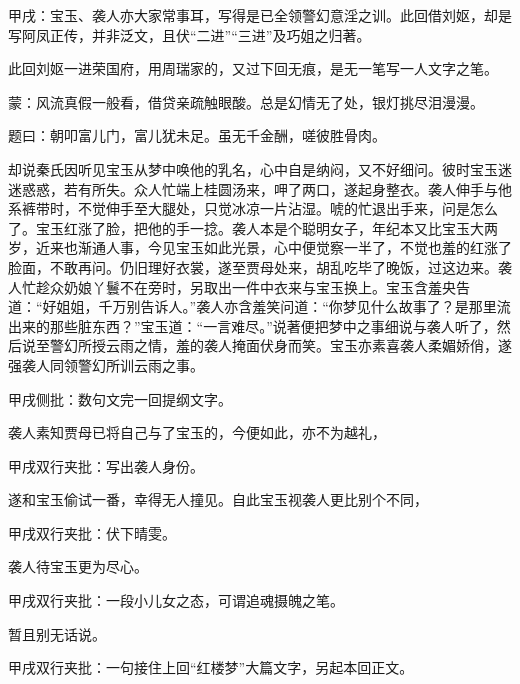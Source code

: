 \begin{parag}

    \begin{note}甲戌：宝玉、袭人亦大家常事耳，写得是已全领警幻意淫之训。此回借刘妪，却是写阿凤正传，并非泛文，且伏“二进”“三进”及巧姐之归著。\end{note}
\end{parag}


\begin{parag}


    \begin{note}此回刘妪一进荣国府，用周瑞家的，又过下回无痕，是无一笔写一人文字之笔。\end{note}
\end{parag}


\begin{parag}


    \begin{note}蒙：风流真假一般看，借贷亲疏触眼酸。总是幻情无了处，银灯挑尽泪漫漫。\end{note}
\end{parag}

\begin{parag}

    题曰：朝叩富儿门，富儿犹未足。虽无千金酬，嗟彼胜骨肉。
\end{parag}


\begin{parag}


    却说秦氏因听见宝玉从梦中唤他的乳名，心中自是纳闷，又不好细问。彼时宝玉迷迷惑惑，若有所失。众人忙端上桂圆汤来，呷了两口，遂起身整衣。袭人伸手与他系裤带时，不觉伸手至大腿处，只觉冰凉一片沾湿。唬的忙退出手来，问是怎么了。宝玉红涨了脸，把他的手一捻。袭人本是个聪明女子，年纪本又比宝玉大两岁，近来也渐通人事，今见宝玉如此光景，心中便觉察一半了，不觉也羞的红涨了脸面，不敢再问。仍旧理好衣裳，遂至贾母处来，胡乱吃毕了晚饭，过这边来。袭人忙趁众奶娘丫鬟不在旁时，另取出一件中衣来与宝玉换上。宝玉含羞央告道：“好姐姐，千万别告诉人。”袭人亦含羞笑问道：“你梦见什么故事了？是那里流出来的那些脏东西？”宝玉道：“一言难尽。”说著便把梦中之事细说与袭人听了，然后说至警幻所授云雨之情，羞的袭人掩面伏身而笑。宝玉亦素喜袭人柔媚娇俏，遂强袭人同领警幻所训云雨之事。\begin{note}甲戌侧批：数句文完一回提纲文字。\end{note}袭人素知贾母已将自己与了宝玉的，今便如此，亦不为越礼，\begin{note}甲戌双行夹批：写出袭人身份。\end{note}遂和宝玉偷试一番，幸得无人撞见。自此宝玉视袭人更比别个不同，\begin{note}甲戌双行夹批：伏下晴雯。\end{note}袭人待宝玉更为尽心。\begin{note}甲戌双行夹批：一段小儿女之态，可谓追魂摄魄之笔。\end{note}暂且别无话说。\begin{note}甲戌双行夹批：一句接住上回“红楼梦”大篇文字，另起本回正文。\end{note}
\end{parag}


